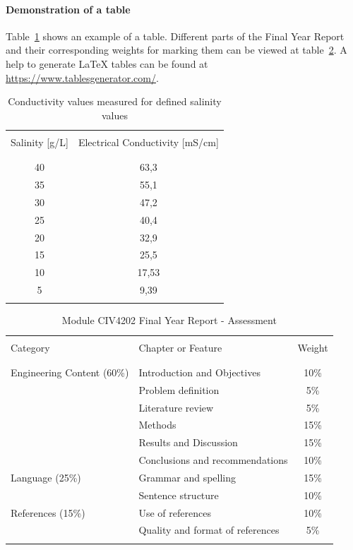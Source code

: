 \paragraph{Demonstration of a table}
Table~\ref{tbl:Salinity-EC} shows an example of a table. Different parts of the Final Year Report and their corresponding weights for marking them can be viewed at table~\ref{tbl:ModuleWeight}. A help to generate LaTeX tables can be found at \url{https://www.tablesgenerator.com/}.
\begin{table}
	\begin{center}
		\caption{\label{tbl:Salinity-EC}Conductivity values measured for defined salinity values}
		\begin{tabular}{cc}
			\hline \\
			Salinity [g/L]	& 	Electrical Conductivity [mS/cm]\\    
			\\
			\hline \\
			40	&	63,3	\\
			35	&	55,1	\\
			30	&	47,2	\\
			25	&	40,4	\\
			20	&	32,9	\\
			15	&	25,5	\\
			10	&	17,53	\\
			5	&	9,39	\\
			\hline \\
		\end{tabular}  
	\end{center}
\end{table}

\begin{table}
	\begin{center}
		\caption{\label{tbl:ModuleWeight}Module CIV4202 Final Year Report - Assessment}
		\begin{tabular}{llc}
			\hline \\
			Category					& Chapter or Feature				& Weight \\
			\\
			\hline \\
			Engineering Content (60\%)	& Introduction and Objectives		& 10\%   \\
										& Problem definition				& 5\%    \\
										& Literature review					& 5\%    \\
										& Methods							& 15\%   \\
										& Results and Discussion			& 15\%   \\
										& Conclusions and recommendations	& 10\%   \\
			Language (25\%)				& Grammar and spelling				& 15\%   \\
										& Sentence structure				& 10\%   \\
			References (15\%)			& Use of references					& 10\%   \\
										& Quality and format of references	& 5\%    \\
			\hline \\
		\end{tabular}
	\end{center}
\end{table}

